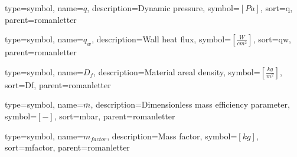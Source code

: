 {
type=symbol, %
name={\ensuremath{q}}, %
description={Dynamic pressure}, %
symbol={$\left[Pa\right]$}, %
sort=q, %
parent=romanletter %
}

{
	type=symbol, %
	name={\ensuremath{q_{w}}}, %
	description={Wall heat flux}, %
	symbol={$\left[\frac{W}{cm^{2}}\right]$}, %
	sort=qw, %
	parent=romanletter %
}

{
type=symbol, %
name={\ensuremath{D_f}}, %
description={Material areal density}, %
symbol={$\left[\frac{kg}{m^2}\right]$}, %
sort=Df, %
parent=romanletter %
}

{
type=symbol, %
name={\ensuremath{\bar{m}}}, %
description={Dimensionless mass efficiency parameter}, %
symbol={$\left[-\right]$}, %
sort=mbar, %
parent=romanletter %
}

{
type=symbol, %
name={\ensuremath{m_{factor}}}, %
description={Mass factor}, %
symbol={$\left[kg \right]$}, %
sort=mfactor, %
parent=romanletter %
}


